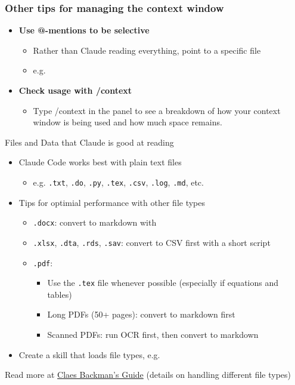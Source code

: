 \documentclass[aspectratio=169, 12pt]{beamer}
\begin{document}
\begin{frame}
\frametitle{Other tips for managing the context window}
\begin{itemize}
    \item {\bf Use @-mentions to be selective}
    \begin{itemize}
        \item Rather than Claude reading everything, point to a specific file
        \item e.g. 
    \end{itemize}
    \item {\bf Check usage with /context}
    \begin{itemize}
        \item Type /context in the panel to see a breakdown of how your context window is being used and how much space remains.

    \end{itemize}
\end{itemize}
\end{frame}


\begin{frame}{Files and Data that Claude is good at reading}
\begin{itemize}
    \item Claude Code works best with plain text files
    \begin{itemize}
        \item e.g. \texttt{.txt}, \texttt{.do}, \texttt{.py}, \texttt{.tex}, \texttt{.csv}, \texttt{.log}, \texttt{.md}, etc.
    \end{itemize}
    \item Tips for optimial performance with other file types
    \begin{itemize}
        \item \texttt{.docx}: convert to markdown with 
        \item \texttt{.xlsx}, \texttt{.dta}, \texttt{.rds}, \texttt{.sav}: convert to CSV first with a short script
        \item \texttt{.pdf}:  
        \begin{itemize}
            \item Use the \texttt{.tex} file whenever possible (especially if equations and tables)
            \item Long PDFs (50+ pages): convert to markdown first
            \item Scanned PDFs: run OCR first, then convert to markdown
        \end{itemize}
        \end{itemize}
    \item Create a skill that loads file types, e.g. 
\end{itemize}
\vfill
\footnotesize Read more at \href{https://claesbackman.com/claude-code-guide.html\#:~:text=What\%20Claude\%20Code\%20Can\%20Read\%20\%E2\%80\%94\%20and\%20What\%20to\%20Convert\%20First
}{Claes Backman's Guide} (details on handling different file types)

\end{frame}
\end{document}
